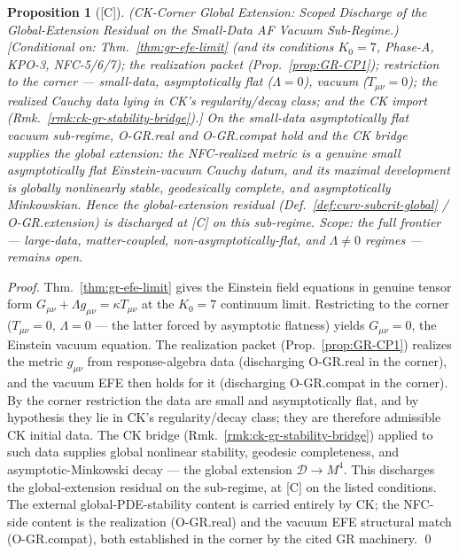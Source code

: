 \documentclass[12pt,oneside]{amsbook}
\theoremstyle{plain}
\newtheorem{proposition}[theorem]{Proposition}
\theoremstyle{definition}
\theoremstyle{remark}
\newcommand{\status}[1]{\textup{[#1]}}
\begin{document}
\begin{proposition}[\status{C}]\label{prop:gr-ck-corner-extension}
\textup{(CK-Corner Global Extension: Scoped Discharge of the Global-Extension
Residual on the Small-Data AF Vacuum Sub-Regime.)}
\textup{[Conditional on: Thm.~\ref{thm:gr-efe-limit} (and its conditions
$K_0=7$, Phase-A, KPO-3, NFC-5/6/7); the realization packet
(Prop.~\ref{prop:GR-CP1}); restriction to the corner --- small-data,
asymptotically flat ($\Lambda=0$), vacuum ($T_{\mu\nu}=0$); the realized
Cauchy data lying in CK's regularity/decay class; and the CK import
(Rmk.~\ref{rmk:ck-gr-stability-bridge}).]}
On the small-data asymptotically flat vacuum sub-regime, O-GR.real and
O-GR.compat hold and the CK bridge supplies the global extension: the
NFC-realized metric is a genuine small asymptotically flat Einstein-vacuum
Cauchy datum, and its maximal development is globally nonlinearly stable,
geodesically complete, and asymptotically Minkowskian. Hence the
global-extension residual (Def.~\ref{def:curv-subcrit-global} /
O-GR.extension) is discharged at \status{C} on this sub-regime.
\emph{Scope:} the full frontier --- large-data, matter-coupled,
non-asymptotically-flat, and $\Lambda\neq0$ regimes --- remains open.
\end{proposition}

\begin{proof}
Thm.~\ref{thm:gr-efe-limit} gives the Einstein field equations in genuine
tensor form $G_{\mu\nu} + \Lambda g_{\mu\nu} = \kappa T_{\mu\nu}$ at the
$K_0=7$ continuum limit. Restricting to the corner ($T_{\mu\nu}=0$,
$\Lambda=0$ --- the latter forced by asymptotic flatness) yields
$G_{\mu\nu}=0$, the Einstein vacuum equation. The realization packet
(Prop.~\ref{prop:GR-CP1}) realizes the metric $g_{\mu\nu}$ from
response-algebra data (discharging O-GR.real in the corner), and the
vacuum EFE then holds for it (discharging O-GR.compat in the corner). By
the corner restriction the data are small and asymptotically flat, and by
hypothesis they lie in CK's regularity/decay class; they are therefore
admissible CK initial data. The CK bridge
(Rmk.~\ref{rmk:ck-gr-stability-bridge}) applied to such data supplies
global nonlinear stability, geodesic completeness, and
asymptotic-Minkowski decay --- the global extension
$\mathcal{D}\to M^4$. This discharges the global-extension residual on
the sub-regime, at \status{C} on the listed conditions. The external
global-PDE-stability content is carried entirely by CK; the NFC-side
content is the realization (O-GR.real) and the vacuum EFE structural
match (O-GR.compat), both established in the corner by the cited GR
machinery. \qed
\end{proof}
\end{document}

